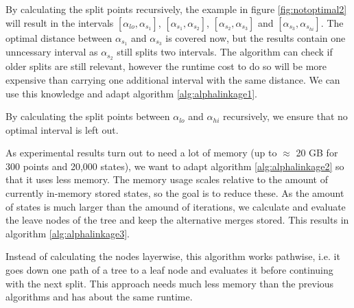 By calculating the split points recursively, the example in figure \ref{fig:notoptimal2} will result in the intervals $[\alpha_{lo}, \alpha_{s_1}]$, $[\alpha_{s_1}, \alpha_{s_2}]$, $[\alpha_{s_2}, \alpha_{s_3}]$ and $[\alpha_{s_3}, \alpha_{s_{hi}}]$. The optimal distance between $\alpha_{s_1}$ and $\alpha_{s_3}$ is covered now, but the results contain one unncessary interval as $\alpha_{s_2}$ still splits two intervals. The algorithm can check if older splits are still relevant, however the runtime cost to do so will be more expensive than carrying one additional interval with the same distance. We can use this knowledge and adapt algorithm \ref{alg:alphalinkage1}.

\begin{algorithm}[H]
    \caption{By calculating the split points between $\alpha_{lo}$ and $\alpha_{hi}$ recursively, we ensure that no optimal interval is left out.}
    \label{alg:alphalinkage2}
\end{algorithm}

As experimental results turn out to need a lot of memory (up to $\approx$ 20 GB for 300 points and 20,000 states), we want to adapt algorithm \ref{alg:alphalinkage2} so that it uses less memory. The memory usage scales relative to the amount of currently in-memory stored states, so the goal is to reduce these. As the amount of states is much larger than the amound of iterations, we calculate and evaluate the leave nodes of the tree and keep the alternative merges stored. This results in algorithm \ref{alg:alphalinkage3}.

\begin{algorithm}[H]
    \caption{Instead of calculating the nodes layerwise, this algorithm works pathwise, i.e. it goes down one path of a tree to a leaf node and evaluates it before continuing with the next split. This approach needs much less memory than the previous algorithms and has about the same runtime.}
    \label{alg:alphalinkage3}
\end{algorithm}

